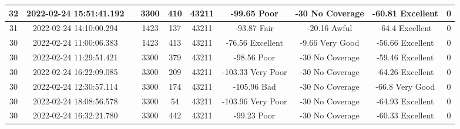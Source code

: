 \begin{longtable*}{|c|c|c|c|c|c|c|c|c|c|}
32&2022-02-24 15:51:41.192&&3300&410&43211& -99.65    Poor        & -30       No Coverage & -60.81    Excellent   & 0\\\hline
{}31&2022-02-24 14:10:00.294&&1423&137&43211& -93.87    Fair        & -20.16    Awful       & -64.4     Excellent   & 0\\\hline
{}30&2022-02-24 11:00:06.383&&1423&413&43211& -76.56    Excellent   & -9.66     Very Good   & -56.66    Excellent   & 0\\\hline
{}30&2022-02-24 11:29:51.421&&3300&379&43211& -98.56    Poor        & -30       No Coverage & -59.46    Excellent   & 0\\\hline
{}30&2022-02-24 16:22:09.085&&3300&209&43211& -103.33   Very Poor   & -30       No Coverage & -64.26    Excellent   & 0\\\hline
{}30&2022-02-24 12:30:57.114&&3300&174&43211& -105.96   Bad         & -30       No Coverage & -66.8     Very Good   & 0\\\hline
{}30&2022-02-24 18:08:56.578&&3300&54&43211& -103.96   Very Poor   & -30       No Coverage & -64.93    Excellent   & 0\\\hline
{}30&2022-02-24 16:32:21.780&&3300&442&43211& -99.23    Poor        & -30       No Coverage & -60.33    Excellent   & 0\\\hline

\end{longtable*}
